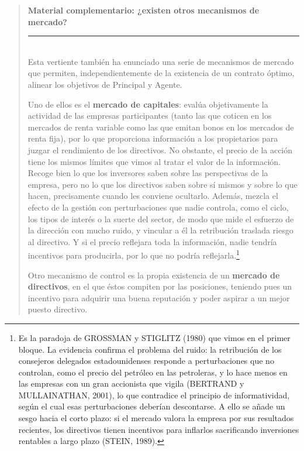 \documentclass[10pt,a4paper]{article}
\newenvironment{specialblock}[1]{%
      \begin{quote} %
      \small %
      \noindent\textbf{#1}\\[-0.3em] %
      \rule{\linewidth}{0.4pt}\\[0.6em]}{
      \end{quote}}
\begin{document}
\begin{specialblock}{\textbf{Material complementario:} ¿existen otros mecanismos de mercado?}
  Esta vertiente también ha enunciado una serie de mecanismos de mercado que permiten, independientemente de la existencia de un contrato óptimo, alinear los objetivos de Principal y Agente.

  Uno de ellos es el \textbf{mercado de capitales}: evalúa objetivamente la actividad de las empresas participantes (tanto las que coticen en los mercados de renta variable como las que emitan bonos en los mercados de renta fija), por lo que proporciona información a los propietarios para juzgar el rendimiento de los directivos. No obstante, el precio de la acción tiene los mismos límites que vimos al tratar el valor de la información. Recoge bien lo que los inversores saben sobre las perspectivas de la empresa, pero no lo que los directivos saben sobre sí mismos y sobre lo que hacen, precisamente cuando les conviene ocultarlo. Además, mezcla el efecto de la gestión con perturbaciones que nadie controla, como el ciclo, los tipos de interés o la suerte del sector, de modo que mide el esfuerzo de la dirección con mucho ruido, y vincular a él la retribución traslada riesgo al directivo. Y si el precio reflejara toda la información, nadie tendría incentivos para producirla, por lo que no podría reflejarla.\footnote{%
    Es la paradoja de GROSSMAN y STIGLITZ (1980) que vimos en el primer bloque. La evidencia confirma el problema del ruido: la retribución de los consejeros delegados estadounidenses responde a perturbaciones que no controlan, como el precio del petróleo en las petroleras, y lo hace menos en las empresas con un gran accionista que vigila (BERTRAND y MULLAINATHAN, 2001), lo que contradice el principio de informatividad, según el cual esas perturbaciones deberían descontarse. A ello se añade un sesgo hacia el corto plazo: si el mercado valora la empresa por sus resultados recientes, los directivos tienen incentivos para inflarlos sacrificando inversiones rentables a largo plazo (STEIN, 1989).
}

  Otro mecanismo de control es la propia existencia de un \textbf{mercado de directivos}, en el que éstos compiten por las posiciones, teniendo pues un incentivo para adquirir una buena reputación y poder aspirar a un mejor puesto directivo.


\end{specialblock}
\end{document}
